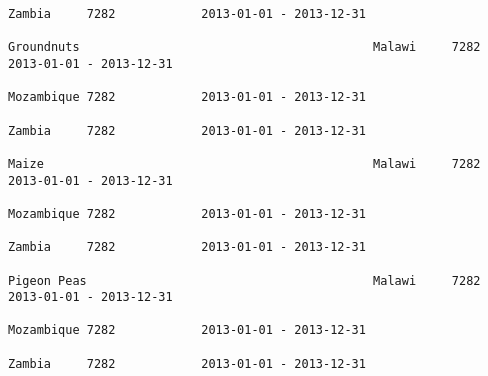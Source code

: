\documentclass[11pt]{article}
\begin{document}
\begin{Verbatim}[commandchars=\\\{\}]
                                                                                                                                                                                                                 Zambia     7282            2013-01-01 - 2013-12-31   
                                                                                                                                                              Groundnuts                                         Malawi     7282            2013-01-01 - 2013-12-31   
                                                                                                                                                                                                                 Mozambique 7282            2013-01-01 - 2013-12-31   
                                                                                                                                                                                                                 Zambia     7282            2013-01-01 - 2013-12-31   
                                                                                                                                                              Maize                                              Malawi     7282            2013-01-01 - 2013-12-31   
                                                                                                                                                                                                                 Mozambique 7282            2013-01-01 - 2013-12-31   
                                                                                                                                                                                                                 Zambia     7282            2013-01-01 - 2013-12-31   
                                                                                                                                                              Pigeon Peas                                        Malawi     7282            2013-01-01 - 2013-12-31   
                                                                                                                                                                                                                 Mozambique 7282            2013-01-01 - 2013-12-31   
                                                                                                                                                                                                                 Zambia     7282            2013-01-01 - 2013-12-31   

\end{Verbatim}
\end{document}
